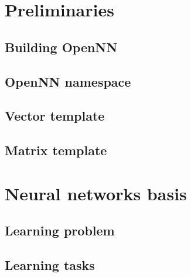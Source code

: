 \documentclass[pdftex, a4paper, 10pt]{book}
\begin{document}
\tableofcontents


\chapter{Preliminaries}\label{Preliminaries}

\section{Building OpenNN}\label{BuildingOpenNN}


\section{OpenNN namespace}\label{OpenNNNamespace}


\section{Vector template}\label{VectorTemplate}


\section{Matrix template}\label{MatrixTemplate}



\chapter{Neural networks basis}\label{NeuralNetworksBasis}


\section{Learning problem}\label{LearningProblem}


\section{Learning tasks}\label{LearningTasks}

\end{document}
